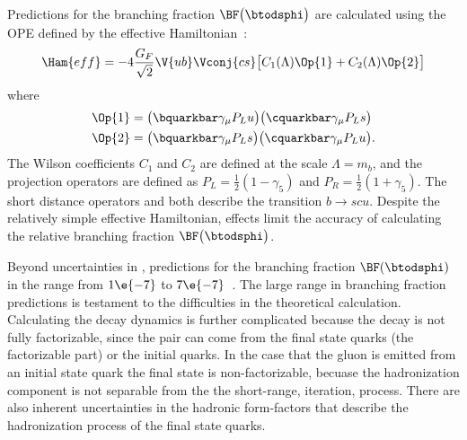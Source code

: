 Predictions for the branching fraction $\BF\big(\btodsphi\big)$ are calculated using the OPE defined
by the effective Hamiltonian~\cite{Zou:2009zza,Mohanta:2002wf,PhysRevD.76.057701,Lu:2001yz}:
\begin{equation}
  \Ham{eff}=
  -4\frac{G_F}{\sqrt{2}} \V{ub}\Vconj{cs}
  \big[
    C_1(\Lambda)\Op{1}+C_2(\Lambda)\Op{2}
    \big]
\end{equation}
where
\begin{align}
  \Op{1} &= \big(\bquarkbar\gamma_\mu P_Lu\big) \big(\cquarkbar\gamma_\mu P_Ls\big) \nonumber\\
  \Op{2} &= \big(\bquarkbar\gamma_\mu P_Ls\big) \big(\cquarkbar\gamma_\mu P_Lu\big).
\end{align}
The Wilson coefficients $C_1$ and $C_2$ are defined at the scale $\Lambda=m_b$,
and the projection operators are defined as $P_L=\tfrac12(1-\gamma_5)$ and
$P_R=\tfrac12(1+\gamma_5)$.
The short distance operators  and  both describe the transition $b\!\to scu$.
Despite the relatively simple effective Hamiltonian, \QCD effects limit the accuracy of calculating
the relative branching fraction $\BF\big(\btodsphi\big)$.

Beyond uncertainties in , predictions for the branching fraction $\BF(\btodsphi)$ in the \sm
range from
\approx$1\e{-7}$ to
\approx$7\e{-7}$~\cite{Zou:2009zza,Mohanta:2002wf,PhysRevD.76.057701,Lu:2001yz}.
The large range in branching fraction predictions is testament to the difficulties in the
theoretical calculation.
Calculating the decay dynamics is further complicated because the decay \btodsphi is not fully
factorizable, since the \ssbar pair can come from the final state quarks (the factorizable part) or
the initial quarks.
In the case that the gluon is emitted from an initial state quark the final state is
non-factorizable, becuase the hadronization component is not separable from the the short-range,
iteration, process.
There are also inherent uncertainties in the hadronic form-factors that describe the hadronization
process of the final state quarks.

